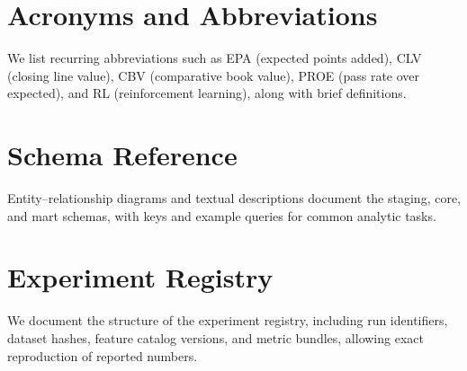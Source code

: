 \documentclass[12pt]{report}  %
\numberwithin{equation}{section}
\theoremstyle{plain}
\theoremstyle{definition}
\theoremstyle{remark}
\begin{document}

\section{Acronyms and Abbreviations}
We list recurring abbreviations such as EPA (expected points added), CLV (closing line value), CBV (comparative book value), PROE (pass rate over expected), and RL (reinforcement learning), along with brief definitions.

\section{Schema Reference}
Entity--relationship diagrams and textual descriptions document the staging, core, and mart schemas, with keys and example queries for common analytic tasks.

\section{Experiment Registry}
We document the structure of the experiment registry, including run identifiers, dataset hashes, feature catalog versions, and metric bundles, allowing exact reproduction of reported numbers.
\end{document}
